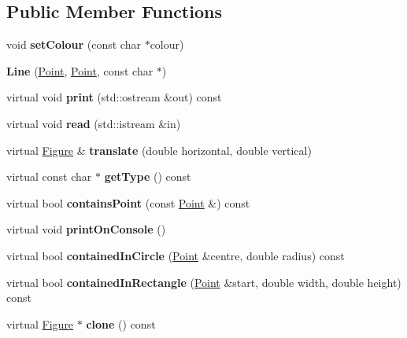 \subsection*{Public Member Functions}
\begin{DoxyCompactItemize}
\item 
\mbox{\label{class_line_a46234fec416916bd5f3bf20f600f825a}} 
void {\bfseries set\+Colour} (const char $\ast$colour)
\item 
\mbox{\label{class_line_a2dc95eb43f2479dd8008e1f0c4342dc1}} 
{\bfseries Line} (\mbox{\hyperlink{struct_point}{Point}}, \mbox{\hyperlink{struct_point}{Point}}, const char $\ast$)
\item 
\mbox{\label{class_line_a9f6175ecb3ccaf318d7be93fea5bf67b}} 
virtual void {\bfseries print} (std\+::ostream \&out) const
\item 
\mbox{\label{class_line_a06287e9f033da319b9b4884ff3aa3064}} 
virtual void {\bfseries read} (std\+::istream \&in)
\item 
\mbox{\label{class_line_aebbcf39a755dcf962e35c889160ae8b6}} 
virtual \mbox{\hyperlink{class_figure}{Figure}} \& {\bfseries translate} (double horizontal, double vertical)
\item 
\mbox{\label{class_line_ac127857283849052f2e664360414b987}} 
virtual const char $\ast$ {\bfseries get\+Type} () const
\item 
\mbox{\label{class_line_a4cac4be11268102414f167444fc0a2f6}} 
virtual bool {\bfseries contains\+Point} (const \mbox{\hyperlink{struct_point}{Point}} \&) const
\item 
\mbox{\label{class_line_a41ec54717203d18e95c63e99c9449ee0}} 
virtual void {\bfseries print\+On\+Console} ()
\item 
\mbox{\label{class_line_a8875c2148536aca6c79d0081c591335b}} 
virtual bool {\bfseries contained\+In\+Circle} (\mbox{\hyperlink{struct_point}{Point}} \&centre, double radius) const
\item 
\mbox{\label{class_line_a0ab1c4e03acf1702870aa73d62a833dd}} 
virtual bool {\bfseries contained\+In\+Rectangle} (\mbox{\hyperlink{struct_point}{Point}} \&start, double width, double height) const
\item 
\mbox{\label{class_line_ab5c285cbbc4e4d95e223574cab07a0b9}} 
virtual \mbox{\hyperlink{class_figure}{Figure}} $\ast$ {\bfseries clone} () const
\end{DoxyCompactItemize}


